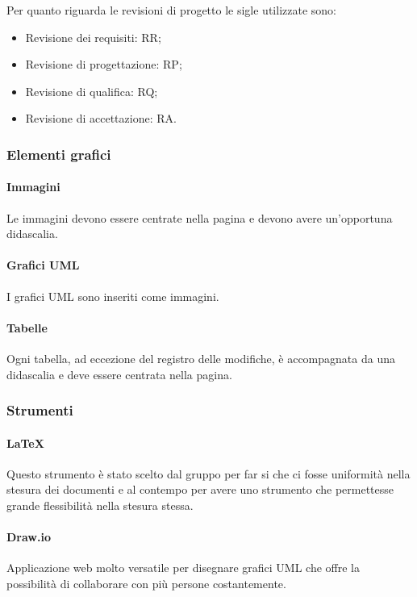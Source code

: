 \documentclass[../norme_di_progetto.tex]{subfiles}
\begin{document}
Per quanto riguarda le revisioni di progetto le sigle utilizzate sono:
\begin{itemize}
    \item Revisione dei requisiti: RR;
    \item Revisione di progettazione: RP;
    \item Revisione di qualifica: RQ;
    \item Revisione di accettazione: RA.
\end{itemize}

\subsubsection{Elementi grafici}

\paragraph{Immagini}
Le immagini devono essere centrate nella pagina e devono avere un'opportuna didascalia.

\paragraph{Grafici UML}
I grafici UML sono inseriti come immagini.

\paragraph{Tabelle}
Ogni tabella, ad eccezione del registro delle modifiche, è accompagnata da una didascalia e deve essere centrata nella pagina.

\subsubsection{Strumenti}

\paragraph{\LaTeX}
Questo strumento è stato scelto dal gruppo per far si che ci fosse uniformità nella stesura dei documenti e al contempo per avere uno strumento che permettesse grande flessibilità nella stesura stessa.

\paragraph{Draw.io}
Applicazione web molto versatile per disegnare grafici UML che offre la possibilità di collaborare con più persone costantemente.
\end{document}
